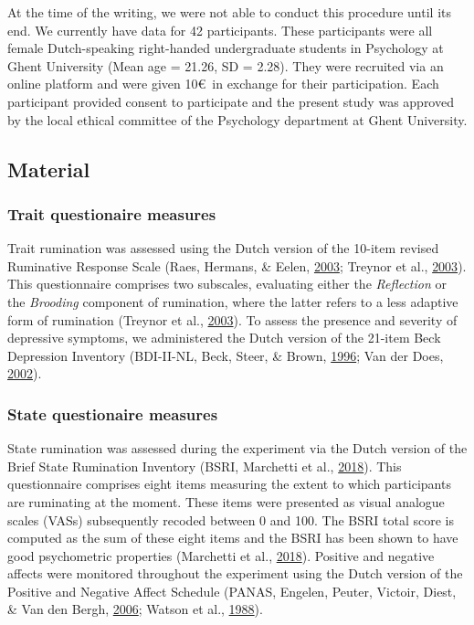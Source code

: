 \documentclass[a4paper,12pt,twoside,openright,oldfontcommands,final]{memoir}
\begin{document}
At the time of the writing, we were not able to conduct this procedure until its end. We currently have data for 42 participants. These participants were all female Dutch-speaking right-handed undergraduate students in Psychology at Ghent University (Mean age = 21.26, SD = 2.28). They were recruited via an online platform and were given 10\euro~in exchange for their participation. Each participant provided consent to participate and the present study was approved by the local ethical committee of the Psychology department at Ghent University.

\hypertarget{material-4}{%
\subsection{Material}\label{material-4}}

\hypertarget{trait-questionaire-measures}{%
\subsubsection{Trait questionaire measures}\label{trait-questionaire-measures}}

Trait rumination was assessed using the Dutch version of the 10-item revised Ruminative Response Scale (Raes, Hermans, \& Eelen, \protect\hyperlink{ref-raes_kort_2003}{2003}; Treynor et al., \protect\hyperlink{ref-treynor_rumination_2003}{2003}). This questionnaire comprises two subscales, evaluating either the \emph{Reflection} or the \emph{Brooding} component of rumination, where the latter refers to a less adaptive form of rumination (Treynor et al., \protect\hyperlink{ref-treynor_rumination_2003}{2003}). To assess the presence and severity of depressive symptoms, we administered the Dutch version of the 21-item Beck Depression Inventory (BDI-II-NL, Beck, Steer, \& Brown, \protect\hyperlink{ref-beck_manual_1996}{1996}; Van der Does, \protect\hyperlink{ref-van_der_does_nederlandse_2002}{2002}).

\hypertarget{state-questionaire-measures}{%
\subsubsection{State questionaire measures}\label{state-questionaire-measures}}

State rumination was assessed during the experiment via the Dutch version of the Brief State Rumination Inventory (BSRI, Marchetti et al., \protect\hyperlink{ref-marchetti_brief_2018}{2018}). This questionnaire comprises eight items measuring the extent to which participants are ruminating at the moment. These items were presented as visual analogue scales (VASs) subsequently recoded between 0 and 100. The BSRI total score is computed as the sum of these eight items and the BSRI has been shown to have good psychometric properties (Marchetti et al., \protect\hyperlink{ref-marchetti_brief_2018}{2018}). Positive and negative affects were monitored throughout the experiment using the Dutch version of the Positive and Negative Affect Schedule (PANAS, Engelen, Peuter, Victoir, Diest, \& Van den Bergh, \protect\hyperlink{ref-engelen_verdere_2006}{2006}; Watson et al., \protect\hyperlink{ref-watson_development_1988}{1988}).
\end{document}
